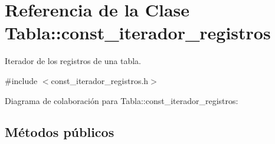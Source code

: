 \hypertarget{classTabla_1_1const__iterador__registros}{}\section{Referencia de la Clase Tabla\+:\+:const\+\_\+iterador\+\_\+registros}
\label{classTabla_1_1const__iterador__registros}


Iterador de los registros de una tabla.  




{\ttfamily \#include $<$const\+\_\+iterador\+\_\+registros.\+h$>$}



Diagrama de colaboración para Tabla\+:\+:const\+\_\+iterador\+\_\+registros\+:
\subsection*{Métodos públicos}
